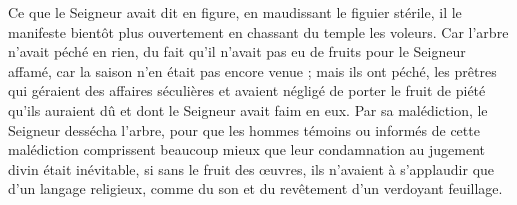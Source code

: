 Ce que le Seigneur avait dit en figure, en maudissant le figuier stérile, il le manifeste bientôt plus ouvertement en chassant du temple les voleurs. Car l’arbre n’avait péché en rien, du fait qu’il n’avait pas eu de fruits pour le Seigneur affamé, car la saison n’en était pas encore venue ; mais ils ont péché, les prêtres qui géraient des affaires séculières et avaient négligé de porter le fruit de piété qu’ils auraient dû et dont le Seigneur avait faim en eux. Par sa malédiction, le Seigneur dessécha l’arbre, pour que les hommes témoins ou informés de cette malédiction comprissent beaucoup mieux que leur condamnation au jugement divin était inévitable, si sans le fruit des œuvres, ils n’avaient à s’applaudir que d’un langage religieux, comme du son et du revêtement d’un verdoyant feuillage.
